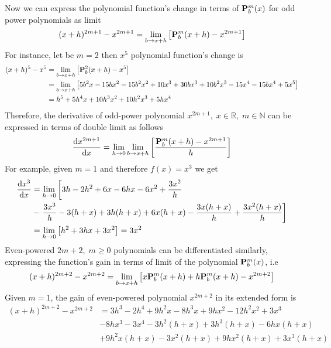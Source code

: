 Now we can express the polynomial function's change in terms of ${\mathbf{P}}\sp{m} \sb{b}(x)$ for odd power polynomials
as limit
\[
    (x+h)^{2m+1} - x^{2m+1} = \lim_{b \to x+h} \left[ {\mathbf{P}}\sp{m} \sb{b}(x+h) - x^{2m+1} \right]
\]
For instance, let be $m=2$ then $x^5$ polynomial function's change is
\begin{equation*}
    \begin{split}
    (x+h)
        ^{5} - x^{5} &= \lim_{b \to x+h} \left[ {\mathbf{P}}\sp{2} \sb{b}(x+h) - x^{5} \right] \\
        &= \lim_{b \to x+h} \left[ 5 b^2 x - 15 b x^2 - 15 b^2 x^2 + 10 x^3 + 30 b x^3 + 10 b^2 x^3 - 15 x^4 - 15 b x^4 + 5 x^5 \right] \\
        &= h^5 + 5 h^4 x + 10 h^3 x^2 + 10 h^2 x^3 + 5 h x^4
    \end{split}
\end{equation*}
Therefore, the derivative of odd-power polynomial $x^{2m+1}, \; x\in\mathbb{R}, \; m\in\mathbb{N}$ can be expressed in terms of double limit as follows
\begin{equation}
    \odv{x^{2m+1}}{x} = \lim_{h \to 0} \lim_{b \to x+h} \left[ \frac{\polynomialP{m}{b}{x+h} - x^{2m+1}}{h} \right]\label{eq:odd-power-derivative}
\end{equation}
For example, given $m=1$ and therefore $f(x) = x^3$ we get
\begin{equation*}
    \begin{split}
        \odv{x^3}{x} &= \lim_{h \to 0} \left[ 3 h - 2 h^2 + 6 x - 6 h x - 6 x^2 + \frac{3 x^2}{h} \right. \\
        &- \left.\frac{3 x^3}{h} - 3 (h + x) + 3 h (h + x) + 6 x (h + x)- \frac{3 x (h + x)}{h} + \frac{3 x^2 (h + x)}{h} \right] \\
        &=\lim_{h \to 0} \left[ h^2 + 3 h x + 3 x^2 \right] = 3x^2
    \end{split}
\end{equation*}
Even-powered $2m+2, \; m\geq 0$ polynomials can be differentiated similarly, expressing the function's gain in terms
of limit of the polynomial ${\mathbf{P}}\sp{m} \sb{b}(x)$, i.e
\[
    (x+h)^{2m+2} - x^{2m+2} = \lim_{b \to x+h} \left[ x{\mathbf{P}}\sp{m} \sb{b}(x+h) + h{\mathbf{P}}\sp{m} \sb{b}(x+h)  - x^{2m+2} \right]
\]
Given $m=1$, the gain of even-powered polynomial $x^{2m+2}$ in its extended form is
\begin{equation*}
    \begin{split}
    (x+h)
        ^{2m+2} - x^{2m+2}
        &= 3 h^3 - 2 h^4 + 9 h^2 x - 8 h^3 x + 9 h x^2 - 12 h^2 x^2 + 3 x^3 \\
        &- 8 h x^3 - 3 x^4 - 3 h^2 (h + x) + 3 h^3 (h + x) - 6 h x (h + x) \\
        &+ 9 h^2 x (h + x) - 3 x^2 (h + x) + 9 h x^2 (h + x) + 3 x^3 (h + x)
    \end{split}
\end{equation*}
